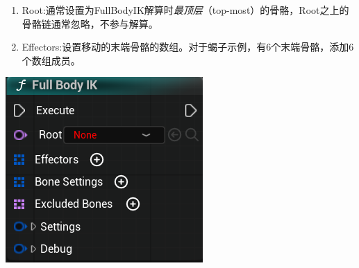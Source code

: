 \documentclass[math,code,12pt]{amznotes}
\begin{document}
		\begin{tcolorbox}[breakable,enhanced,bicolor,sidebyside,lefthand width=.45\linewidth,
		 sharp corners,boxrule=.4pt,colback=green!5,colbacklower=green!50!black!50,nobeforeafter]
		 \begin{enumerate}
		 \item Root:通常设置为FullBodyIK解算时\emph{最顶层}（top-most）的骨骼，Root之上的骨骼链通常忽略，不参与解算。
		 \item Effectors:设置移动的末端骨骼的数组。对于蝎子示例，有6个末端骨骼，添加6个数组成员。
		 \end{enumerate}
		 \tcblower
		 \includegraphics[width=\linewidth]{./images/fullBodyIK}
		 \end{tcolorbox}
\end{document}
